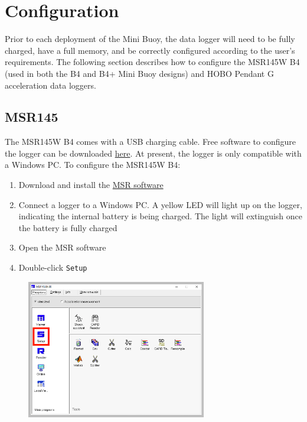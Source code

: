 \documentclass[
  letterpaper,
  DIV=11,
  numbers=noendperiod]{scrreprt}
\providecommand{\tightlist}{%
  \setlength{\itemsep}{0pt}\setlength{\parskip}{0pt}}\usepackage{longtable,booktabs,array}
\begin{document}

\hypertarget{configuration}{%
\chapter{Configuration}\label{configuration}}

Prior to each deployment of the Mini Buoy, the data logger will need to
be fully charged, have a full memory, and be correctly configured
according to the user's requirements. The following section describes
how to configure the MSR145W B4 (used in both the B4 and B4+ Mini Buoy
designs) and HOBO Pendant G acceleration data loggers.

\hypertarget{msr145}{%
\section{MSR145}\label{msr145}}

The MSR145W B4 comes with a USB charging cable. Free software to
configure the logger can be downloaded
\href{https://www.msr.ch/en/support/msr-pc-software-standard/}{here}. At
present, the logger is only compatible with a Windows PC. To configure
the MSR145W B4:

\begin{enumerate}
\def\labelenumi{\arabic{enumi}.}
\tightlist
\item
  Download and install the
  \href{https://www.msr.ch/en/support/pcsoftware/}{MSR software}
\item
  Connect a logger to a Windows PC. A yellow LED will light up on the
  logger, indicating the internal battery is being charged. The light
  will extinguish once the battery is fully charged
\item
  Open the MSR software
\item
  Double-click \texttt{Setup}
\end{enumerate}

\begin{figure}

{\centering \includegraphics[width=0.7\textwidth,height=\textheight]{chapters/figs/MSRStep1.png}

}

\end{figure}
\end{document}
